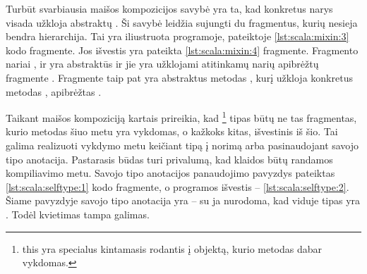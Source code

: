 \begin{scalacodelisting}
  \caption{Fragmentų hierarchijos modifikavimas}
  \label{lst:scala:mixin:1}
\end{scalacodelisting}

\begin{scalainterpreterlisting}
  \caption{\ref{lst:scala:mixin:1} TODO}
  \label{lst:scala:mixin:2}
\end{scalainterpreterlisting}

Turbūt svarbiausia maišos kompozicijos savybė yra ta, kad konkretus
narys visada užkloja abstraktų
\cite[6]{scalable-component-abstractions}. Ši savybė leidžia
sujungti du fragmentus, kurių nesieja bendra hierarchija. Tai yra
iliustruota programoje, pateiktoje \ref{lst:scala:mixin:3} kodo
fragmente. Jos išvestis yra pateikta \ref{lst:scala:mixin:4}
fragmente. Fragmento  nariai
,  ir  yra abstraktūs
ir jie yra užklojami atitinkamų narių apibrėžtų fragmente
. Fragmente  taip pat yra
abstraktus metodas , kurį užkloja konkretus metodas
, apibrėžtas .

\begin{scalacodelisting}
  \caption{Maišos kompozicijos pavyzdys}
  \label{lst:scala:mixin:3}
\end{scalacodelisting}

\begin{scalainterpreterlisting}
  \caption{\ref{lst:scala:mixin:3} TODO}
  \label{lst:scala:mixin:4}
\end{scalainterpreterlisting}

Taikant maišos kompoziciją kartais prireikia, kad
\footnote{this yra specialus kintamasis rodantis į
objektą, kurio metodas dabar vykdomas.} tipas būtų ne tas fragmentas,
kurio metodas šiuo metu yra vykdomas, o kažkoks kitas, išvestinis
iš šio. Tai galima realizuoti vykdymo metu keičiant 
tipą į norimą arba pasinaudojant  savojo tipo
anotacija. Pastarasis būdas turi privalumą, kad klaidos būtų randamos
kompiliavimo metu. Savojo tipo anotacijos panaudojimo pavyzdys pateiktas
\ref{lst:scala:selftype:1} kodo fragmente, o programos išvestis
– \ref{lst:scala:selftype:2}. Šiame pavyzdyje savojo tipo anotacija
yra  – su ja nurodoma, kad 
viduje  tipas yra . Todėl kvietimas
 tampa galimas.


